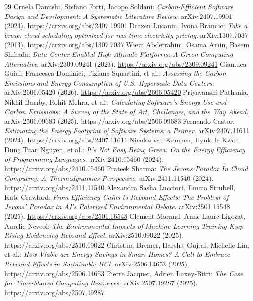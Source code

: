 \documentclass[11pt,a4paper]{article}
\begin{document}
\begin{thebibliography}{99}
 Ornela Danushi, Stefano Forti, Jacopo Soldani: \emph{Carbon-Efficient Software Design and Development: A Systematic Literature Review}. arXiv:2407.19901 (2024). \url{https://arxiv.org/abs/2407.19901}
 Drazen Lucanin, Ivona Brandic: \emph{Take a break: cloud scheduling optimized for real-time electricity pricing}. arXiv:1307.7037 (2013). \url{https://arxiv.org/abs/1307.7037}
 Wiem Abderrahim, Osama Amin, Basem Shihada: \emph{Data Center-Enabled High Altitude Platforms: A Green Computing Alternative}. arXiv:2309.09241 (2023). \url{https://arxiv.org/abs/2309.09241}
 Gianluca Guidi, Francesca Dominici, Tiziano Squartini, et al.: \emph{Assessing the Carbon Emissions and Energy Consumption of U.S. Hyperscale Data Centers}. arXiv:2606.05420 (2026). \url{https://arxiv.org/abs/2606.05420}
 Priyavanshi Pathania, Nikhil Bamby, Rohit Mehra, et al.: \emph{Calculating Software's Energy Use and Carbon Emissions: A Survey of the State of Art, Challenges, and the Way Ahead}. arXiv:2506.09683 (2025). \url{https://arxiv.org/abs/2506.09683}
 Fernando Castor: \emph{Estimating the Energy Footprint of Software Systems: a Primer}. arXiv:2407.11611 (2024). \url{https://arxiv.org/abs/2407.11611}
 Nicolas van Kempen, Hyuk-Je Kwon, Dung Tuan Nguyen, et al.: \emph{It's Not Easy Being Green: On the Energy Efficiency of Programming Languages}. arXiv:2410.05460 (2024). \url{https://arxiv.org/abs/2410.05460}
 Prateek Sharma: \emph{The Jevons Paradox In Cloud Computing: A Thermodynamics Perspective}. arXiv:2411.11540 (2024). \url{https://arxiv.org/abs/2411.11540}
 Alexandra Sasha Luccioni, Emma Strubell, Kate Crawford: \emph{From Efficiency Gains to Rebound Effects: The Problem of Jevons' Paradox in AI's Polarized Environmental Debate}. arXiv:2501.16548 (2025). \url{https://arxiv.org/abs/2501.16548}
 Clement Morand, Anne-Laure Ligozat, Aurelie Neveol: \emph{The Environmental Impacts of Machine Learning Training Keep Rising Evidencing Rebound Effect}. arXiv:2510.09022 (2025). \url{https://arxiv.org/abs/2510.09022}
 Christina Bremer, Harshit Gujral, Michelle Lin, et al.: \emph{How Viable are Energy Savings in Smart Homes? A Call to Embrace Rebound Effects in Sustainable HCI}. arXiv:2506.14653 (2025). \url{https://arxiv.org/abs/2506.14653}
 Pierre Jacquet, Adrien Luxey-Bitri: \emph{The Case for Time-Shared Computing Resources}. arXiv:2507.19287 (2025). \url{https://arxiv.org/abs/2507.19287}

\end{thebibliography}
\end{document}

